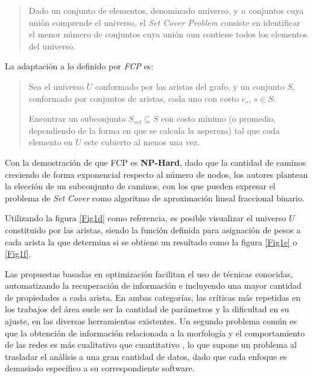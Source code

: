 \documentclass{article}
\begin{document}
\begin{quote}
Dado un conjunto de elementos, denominado universo, y $n$ conjuntos cuya unión comprende el universo, el {\it Set Cover Problem} consiste en identificar el menor n\'umero de conjuntos cuya unión aun contiene todos los elementos del universo.
\end{quote}

La adaptaci\'on a lo definido por {\it FCP} es: 
\begin{quote}
Sea el universo $U$ conformado por las aristas del grafo, y un conjunto $S$, conformado por conjuntos de aristas, cada uno con costo $c_s$, $s \in S$:

Encontrar un subconjunto $S_{set} \subseteq S$ con costo m\'inimo (o promedio, dependiendo de la forma en que se calcula la aspereza) tal que cada elemento en $U$ este cubierto al menos una vez.
\end{quote}

Con la demostraci\'on de que FCP es {\bf NP-Hard}, dado que la cantidad de caminos creciendo de forma exponencial respecto al n\'umero de nodos, los autores plantean la elecci\'on de un subconjunto de caminos, con los que pueden expresar el problema de {\it Set Cover} como algoritmo de aproximaci\'on lineal fraccional binario.

Utilizando la figura \ref{Fig1d} como referencia, es posible visualizar el universo $U$ constituido por las aristas, siendo la funci\'on definida para asignaci\'on de pesos a cada arista la que determina si se obtiene un resultado como la figura \ref{Fig1e} o \ref{Fig1f}.

\bigskip
Las propuestas basadas en optimizaci\'on facilitan el uso de t\'ecnicas conocidas, automatizando la recuperaci\'on de informaci\'on e incluyendo una mayor cantidad de propiedades a cada arista.
En ambas categor\'ias, las cr\'iticas m\'as repetidas en los trabajos del \'area suele ser la cantidad de par\'ametros y la dificultad en su ajuste, en las diversas herramientas existentes. Un segundo problema com\'un es que la obtenci\'on de informaci\'on relacionada a la morfolog\'ia y el comportamiento de las redes es m\'as cualitativo que cuantitativo \cite{asgharzadeh2018computational}\cite{qiu2014quantitative}, lo que supone un problema al trasladar el  an\'alisis a una gran cantidad de datos, dado que cada enfoque es demasiado espec\'ifico a su correspondiente software.
\end{document}
